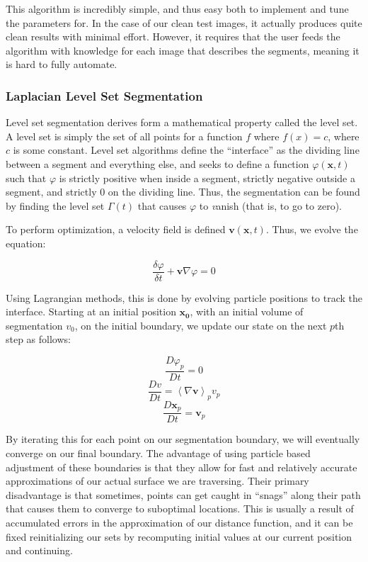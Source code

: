 \documentclass{article}
\begin{document}
This algorithm is incredibly simple, and thus easy both to implement and tune the parameters for. In the case of our clean test images, it actually produces quite clean results with minimal effort. However, it requires that the user feeds the algorithm with knowledge for each image that describes the segments, meaning it is hard to fully automate.

\subsubsection*{Laplacian Level Set Segmentation}

Level set segmentation derives form a mathematical property called the level set. A level set is simply the set of all points for a function $f$ where $f(x) = c$, where $c$ is some constant. Level set algorithms define the ``interface'' as the dividing line between a segment and everything else, and seeks to define a function $\varphi(\mathbf{x},t)$ such that $\varphi$ is strictly positive when inside a segment, strictly negative outside a segment, and strictly $0$ on the dividing line. Thus, the segmentation can be found by finding the level set $\Gamma(t)$ that causes $\varphi$ to {\emph vanish} (that is, to go to zero).

To perform optimization, a velocity field is defined $\mathbf{v}(\mathbf{x},t)$. Thus, we evolve the equation\cite{osher}:

\[\frac{\delta\varphi}{\delta t} + \mathbf{v} \nabla\varphi = 0 \]

Using Lagrangian methods, this is done by evolving particle positions to track the interface. Starting at an initial position $\mathbf{x_0}$, with an initial volume of segmentation $v_0$, on the initial boundary, we update our state on the next $p$th step as follows\cite{hieber}:

\[\frac{D\varphi_p}{Dt} = 0 \]
\[\frac{Dv}{Dt} = \left< \nabla\mathbf{v}\right>_p v_p \]
\[\frac{D\mathbf{x}_p}{Dt} = \mathbf{v}_p \]

By iterating this for each point on our segmentation boundary, we will eventually converge on our final boundary. The advantage of using particle based adjustment of these boundaries is that they allow for fast and relatively accurate approximations of our actual surface we are traversing. Their primary disadvantage is that sometimes, points can get caught in ``snags'' along their path that causes them to converge to suboptimal locations. This is usually a result of accumulated errors in the approximation of our distance function, and it can be fixed reinitializing our sets by recomputing initial values at our current position and continuing\cite{hieber}.
\end{document}
